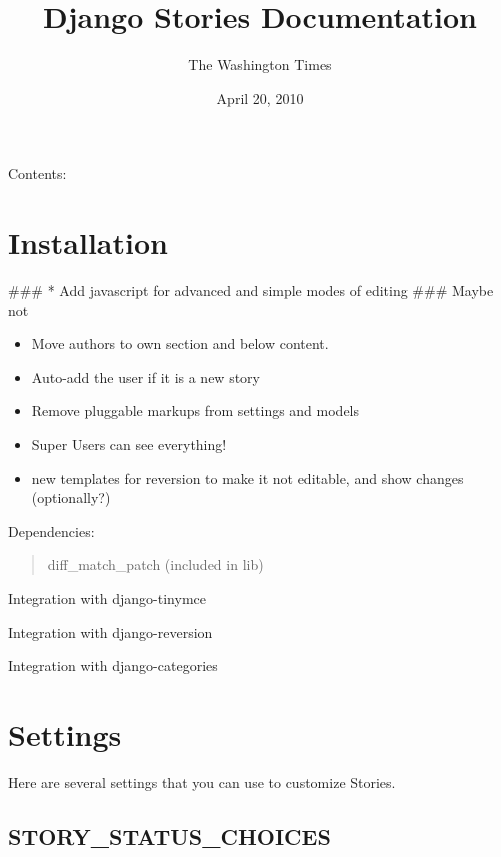 \documentclass[letterpaper,10pt,english]{manual}
\title{Django Stories Documentation}
\date{April 20, 2010}
\author{The Washington Times}
\begin{document}
\maketitle
\tableofcontents
\hypertarget{--doc-index}{}


Contents:

\resetcurrentobjects
\hypertarget{--doc-install}{}

\chapter{Installation}

\#\#\# * Add javascript for advanced and simple modes of editing \#\#\# Maybe not
\begin{itemize}
\item {} 
Move authors to own section and below content.

\item {} 
Auto-add the user if it is a new story

\item {} 
Remove pluggable markups from settings and models

\item {} 
Super Users can see everything!

\item {} 
new templates for reversion to make it not editable, and show changes (optionally?)

\end{itemize}

Dependencies:
\begin{quote}

diff\_match\_patch (included in lib)
\end{quote}

Integration with django-tinymce

Integration with django-reversion

Integration with django-categories

\resetcurrentobjects
\hypertarget{--doc-settings}{}

\hypertarget{settings}{}\chapter{Settings}

Here are several settings that you can use to customize Stories.


\hypertarget{story-status-choices}{}\section{STORY\_STATUS\_CHOICES}
\end{document}
